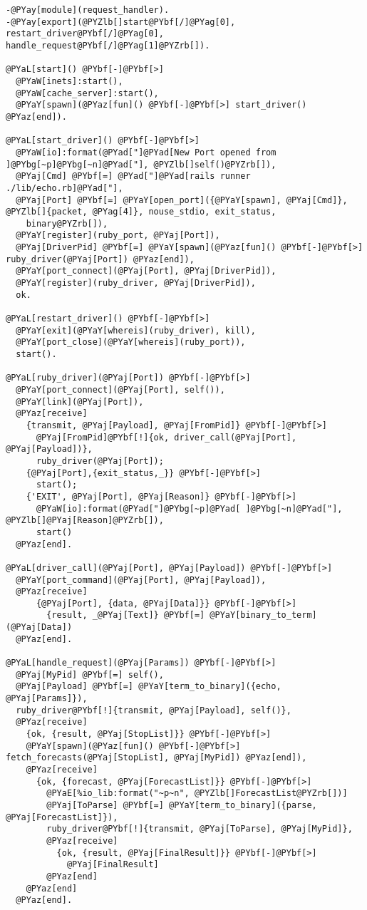 \begin{Verbatim}[commandchars=@\[\]]
-@PYay[module](request_handler).
-@PYay[export](@PYZlb[]start@PYbf[/]@PYag[0], restart_driver@PYbf[/]@PYag[0], handle_request@PYbf[/]@PYag[1]@PYZrb[]).

@PYaL[start]() @PYbf[-]@PYbf[>]
  @PYaW[inets]:start(),
  @PYaW[cache_server]:start(),
  @PYaY[spawn](@PYaz[fun]() @PYbf[-]@PYbf[>] start_driver() @PYaz[end]).

@PYaL[start_driver]() @PYbf[-]@PYbf[>]
  @PYaW[io]:format(@PYad["]@PYad[New Port opened from ]@PYbg[~p]@PYbg[~n]@PYad["], @PYZlb[]self()@PYZrb[]),
  @PYaj[Cmd] @PYbf[=] @PYad["]@PYad[rails runner ./lib/echo.rb]@PYad["],
  @PYaj[Port] @PYbf[=] @PYaY[open_port]({@PYaY[spawn], @PYaj[Cmd]}, @PYZlb[]{packet, @PYag[4]}, nouse_stdio, exit_status,
    binary@PYZrb[]),
  @PYaY[register](ruby_port, @PYaj[Port]),
  @PYaj[DriverPid] @PYbf[=] @PYaY[spawn](@PYaz[fun]() @PYbf[-]@PYbf[>] ruby_driver(@PYaj[Port]) @PYaz[end]),
  @PYaY[port_connect](@PYaj[Port], @PYaj[DriverPid]),
  @PYaY[register](ruby_driver, @PYaj[DriverPid]),
  ok.
  
@PYaL[restart_driver]() @PYbf[-]@PYbf[>]
  @PYaY[exit](@PYaY[whereis](ruby_driver), kill),
  @PYaY[port_close](@PYaY[whereis](ruby_port)),
  start().

@PYaL[ruby_driver](@PYaj[Port]) @PYbf[-]@PYbf[>]
  @PYaY[port_connect](@PYaj[Port], self()),
  @PYaY[link](@PYaj[Port]),
  @PYaz[receive]
    {transmit, @PYaj[Payload], @PYaj[FromPid]} @PYbf[-]@PYbf[>]
      @PYaj[FromPid]@PYbf[!]{ok, driver_call(@PYaj[Port], @PYaj[Payload])},
      ruby_driver(@PYaj[Port]);
    {@PYaj[Port],{exit_status,_}} @PYbf[-]@PYbf[>]
      start();
    {'EXIT', @PYaj[Port], @PYaj[Reason]} @PYbf[-]@PYbf[>]
      @PYaW[io]:format(@PYad["]@PYbg[~p]@PYad[ ]@PYbg[~n]@PYad["], @PYZlb[]@PYaj[Reason]@PYZrb[]),
      start()
  @PYaz[end].

@PYaL[driver_call](@PYaj[Port], @PYaj[Payload]) @PYbf[-]@PYbf[>]
  @PYaY[port_command](@PYaj[Port], @PYaj[Payload]),
  @PYaz[receive]
      {@PYaj[Port], {data, @PYaj[Data]}} @PYbf[-]@PYbf[>]
        {result, _@PYaj[Text]} @PYbf[=] @PYaY[binary_to_term](@PYaj[Data])
  @PYaz[end].

@PYaL[handle_request](@PYaj[Params]) @PYbf[-]@PYbf[>]
  @PYaj[MyPid] @PYbf[=] self(),
  @PYaj[Payload] @PYbf[=] @PYaY[term_to_binary]({echo, @PYaj[Params]}),
  ruby_driver@PYbf[!]{transmit, @PYaj[Payload], self()},
  @PYaz[receive]
    {ok, {result, @PYaj[StopList]}} @PYbf[-]@PYbf[>]
    @PYaY[spawn](@PYaz[fun]() @PYbf[-]@PYbf[>] fetch_forecasts(@PYaj[StopList], @PYaj[MyPid]) @PYaz[end]),
    @PYaz[receive]
      {ok, {forecast, @PYaj[ForecastList]}} @PYbf[-]@PYbf[>]
        @PYaE[%io_lib:format("~p~n", @PYZlb[]ForecastList@PYZrb[])]
        @PYaj[ToParse] @PYbf[=] @PYaY[term_to_binary]({parse, @PYaj[ForecastList]}),
        ruby_driver@PYbf[!]{transmit, @PYaj[ToParse], @PYaj[MyPid]},
        @PYaz[receive]
          {ok, {result, @PYaj[FinalResult]}} @PYbf[-]@PYbf[>]
            @PYaj[FinalResult]
        @PYaz[end]
    @PYaz[end]
  @PYaz[end].


\end{Verbatim}
